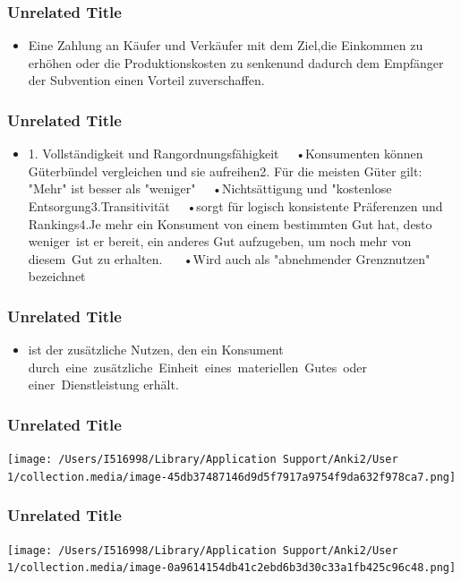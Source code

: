 \documentclass{beamer}
\begin{document}
\begin{frame}
\frametitle{Unrelated Title}


\begin{itemize}
\item Eine Zahlung an Käufer und Verkäufer mit dem Ziel,die Einkommen zu erhöhen oder die Produktionskosten zu senkenund dadurch dem Empfänger der Subvention einen Vorteil zuverschaffen.
\end{itemize}

\note[item]{}
\end{frame}
\begin{frame}
\frametitle{Unrelated Title}


\begin{itemize}
\item 1. Vollständigkeit und Rangordnungsfähigkeit   •Konsumenten können Güterbündel vergleichen und sie aufreihen2. Für die meisten Güter gilt: "Mehr" ist besser als "weniger"   •Nichtsättigung und "kostenlose Entsorgung3.Transitivität   •sorgt für logisch konsistente Präferenzen und Rankings4.Je mehr ein Konsument von einem bestimmten Gut hat, desto weniger ist er bereit, ein anderes Gut aufzugeben, um noch mehr von diesem Gut zu erhalten.    •Wird auch als "abnehmender Grenznutzen" bezeichnet
\end{itemize}

\note[item]{}
\end{frame}
\begin{frame}
\frametitle{Unrelated Title}


\begin{itemize}
\item ist der zusätzliche Nutzen, den ein Konsument durch eine zusätzliche Einheit eines materiellen Gutes oder einer Dienstleistung erhält.
\end{itemize}

\note[item]{}
\end{frame}
\begin{frame}
\frametitle{Unrelated Title}

\begin{center}
\texttt{[image: /Users/I516998/Library/Application Support/Anki2/User 1/collection.media/image-45db37487146d9d5f7917a9754f9da632f978ca7.png]}
\end{center}


\note[item]{}
\end{frame}
\begin{frame}
\frametitle{Unrelated Title}

\begin{center}
\texttt{[image: /Users/I516998/Library/Application Support/Anki2/User 1/collection.media/image-0a9614154db41c2ebd6b3d30c33a1fb425c96c48.png]}
\end{center}


\note[item]{}
\end{frame}
\end{document}
